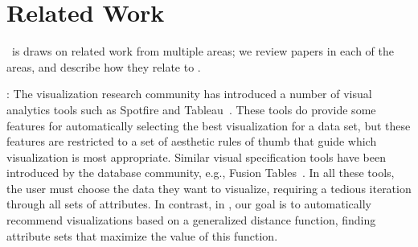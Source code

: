 

\section{Related Work}
\label{sec:related_work}
\SeeDB\ is draws on related work from multiple areas;
we review papers in each of the areas, and describe how they relate to
\SeeDB. 

:
The visualization 
research community has introduced a number of
visual analytics tools such as Spotfire and 
Tableau~\cite{polaris, Ahlberg:1996:SIE:245882.245893}.
These tools do provide some features for automatically selecting
the best visualization for a data set, 
but these features are restricted to a set of aesthetic rules of thumb that
guide which visualization is most appropriate.
Similar visual specification tools 
have been introduced by the
database community, e.g., Fusion
Tables~\cite{DBLP:conf/sigmod/GonzalezHJLMSSG10}. 
In all these tools, the user must choose the data they want to visualize, requiring
a tedious iteration through all sets of attributes.
In contrast, in \SeeDB, our goal is to automatically recommend visualizations
based on a generalized distance function, finding
attribute sets that maximize the value of this function.



